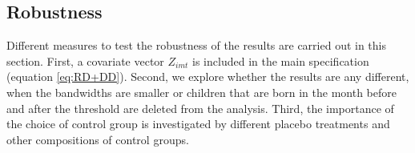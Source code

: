 \documentclass[a4paper ]{article}
\begin{document}








\newpage
\subsection{Robustness}\label{sec: robustness}

  
Different measures to test the robustness of the results are carried out in this section. First, a covariate vector $Z_{imt}$ is included in the main specification (equation \ref{eq:RD+DD}). Second, we explore whether the results are any different, when the bandwidths are smaller or children that are born in the month before and after the threshold are deleted from the analysis. Third, the importance of the choice of control group is investigated by different placebo treatments and other compositions of control groups.\newline
\end{document}
